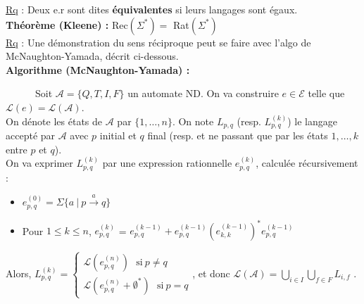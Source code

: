 \documentclass[11pt,a4paper]{article}
\begin{document}
\underline{Rq} : Deux e.r sont dites \textbf{équivalentes} si leurs langages sont égaux. \\

\textbf{Théorème (Kleene) :} Rec$(\Sigma^*) = $ Rat$(\Sigma^*)$ \\

\underline{Rq} : Une démonstration du sens réciproque peut se faire avec l'algo de McNaughton-Yamada, décrit ci-dessous. \\

\textbf{Algorithme (McNaughton-Yamada) :}

\ \ \ \ \ \ Soit $\mathcal{A} = \lbrace Q,T,I,F \rbrace $ un automate ND. On va construire $e\in \mathcal{E}$ telle que $\mathcal{L}(e)=\mathcal{L}(\mathcal{A})$. \\
On dénote les états de $\mathcal{A}$  par $\{1,\dots,n\}$. On note $L_{p,q}$ (resp. $L_{p,q}^{(k)}$) le langage accepté par $\mathcal{A}$ avec $p$ initial et $q$ final (resp. et ne passant que par les états $1,\dots, k$ entre $p$ et $q$). \\
On va exprimer $L_{p,q}^{(k)}$ par une expression rationnelle $e_{p,q}^{(k)}$, calculée récursivement :
\begin{itemize}
\item $e_{p,q}^{(0)} = \Sigma\{a \ | \ p \xrightarrow{a} q \}$
\item Pour $ 1 \leq k \leq n$, $e_{p,q}^{(k)}$ = $e_{p,q}^{(k-1)} + e_{p,q}^{(k-1)}(e_{k,k}^{(k-1)})^*e_{p,q}^{(k-1)}$ 
\end{itemize}
Alors, $L_{p,q}^{(k)} = \begin{cases} \mathcal{L}(e_{p,q}^{(n)}) \ \ \ \text{si} \ p \neq q \\ \mathcal{L}(e_{p,q}^{(n)} + \emptyset^*) \ \ \ \text{si} \ p = q \end{cases}$, et donc $\mathcal{L}(\mathcal{A})=\bigcup\limits_{i \in I}\bigcup\limits_{f \in F} L_{i,f}$ .
\end{document}
